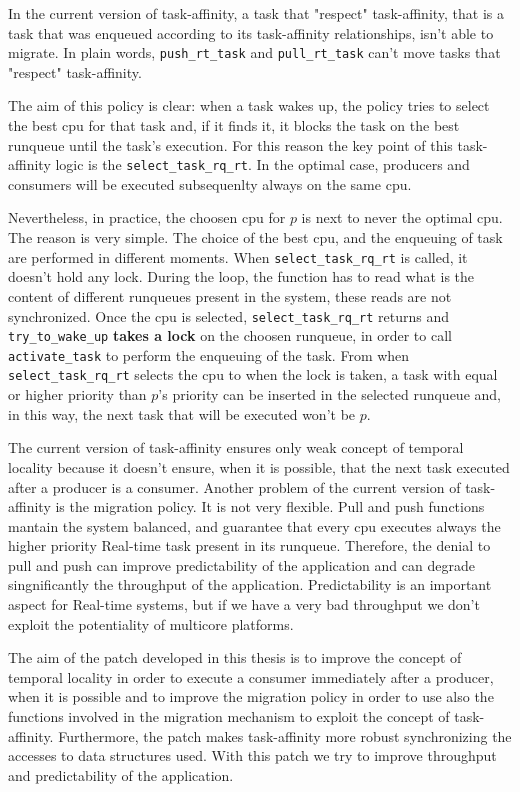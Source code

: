 In the current version of task-affinity, a task that "respect" task-affinity, that is a task that was enqueued according to its task-affinity 
relationships, isn't able to migrate. In plain words, \texttt{push\_rt\_task} and \texttt{pull\_rt\_task} can't move tasks that "respect" task-affinity.

The aim of this policy is clear: when a task wakes up, the policy tries to select the best cpu for that task and, if it finds it, it blocks the task on the 
best runqueue until the task's execution. For this reason the key point of this task-affinity logic is the \texttt{select\_task\_rq\_rt}. In the optimal 
case, producers and consumers will be executed subsequenlty always on the same cpu.

Nevertheless, in practice, the choosen cpu for $p$ is next to never the optimal cpu. The reason is very simple. The choice of the best 
cpu, and the enqueuing of task are performed in different moments. When \texttt{select\_task\_rq\_rt} is called, it doesn't hold any lock. During the loop, 
the function has to read what is the content of different runqueues present in the system, these reads are not synchronized. Once the cpu is selected, 
\texttt{select\_task\_rq\_rt} returns and \texttt{try\_to\_wake\_up} \textbf{takes a lock} on the choosen runqueue, in order to call 
\texttt{activate\_task} to perform the enqueuing of the task. From when \texttt{select\_task\_rq\_rt} selects the cpu to when the lock is taken, a task 
with equal or higher priority than $p$'s priority can be inserted in the selected runqueue and, in this way, the next task that will be executed won't be 
$p$. 

The current version of task-affinity ensures only weak concept of temporal locality because it doesn't ensure, when it is possible, that the next task 
executed after a producer is a consumer. Another problem of the current version of task-affinity is the migration policy. It is not very flexible. Pull 
and push functions mantain the system balanced, and guarantee that every cpu executes always the higher priority Real-time task present in its runqueue.
Therefore, the denial to pull and push can improve predictability of the application and can degrade singnificantly the throughput of the application.
Predictability is an important aspect for Real-time systems, but if we have a very bad throughput we don't exploit the potentiality of multicore platforms.

The aim of the patch developed in this thesis is to improve the concept of temporal locality in order to execute a consumer immediately after a 
producer, when it is possible and to improve the migration policy in order to use also the functions involved in the migration mechanism to exploit the 
concept of task-affinity. Furthermore, the patch makes task-affinity more robust synchronizing the accesses to data structures used. With this patch we 
try to improve throughput and predictability of the application. 

